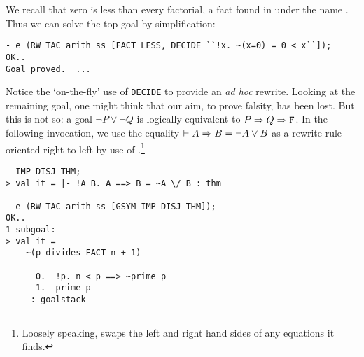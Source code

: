     We recall that zero is less than every factorial, a fact found in
     under the name . Thus we can
    solve the top goal by simplification:
\begin{session}
\begin{verbatim}
- e (RW_TAC arith_ss [FACT_LESS, DECIDE ``!x. ~(x=0) = 0 < x``]);
OK..
Goal proved.  ...
\end{verbatim}
\end{session}
Notice the `on-the-fly' use of \verb+DECIDE+ to provide an \textit{ad hoc}
rewrite. Looking at the remaining goal, one might think that our aim, to
prove falsity, has been lost. But this is not so: a goal
$\neg P \lor \neg Q$ is logically equivalent to $P \Rightarrow Q \Rightarrow \mathtt{F}$.
In the following invocation, we use the equality
$\vdash A \Rightarrow B = \neg A \lor B$ as a rewrite rule oriented right to left by
use of .\footnote{Loosely speaking,  swaps the left and
right hand sides of any equations it finds.}
\begin{session}
\begin{verbatim}
- IMP_DISJ_THM;
> val it = |- !A B. A ==> B = ~A \/ B : thm

- e (RW_TAC arith_ss [GSYM IMP_DISJ_THM]);
OK..
1 subgoal:
> val it =
    ~(p divides FACT n + 1)
    ------------------------------------
      0.  !p. n < p ==> ~prime p
      1.  prime p
     : goalstack
\end{verbatim}
\end{session}

